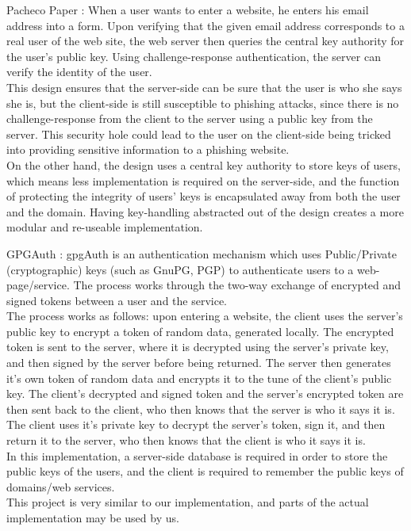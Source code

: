 \documentclass[11pt]{article}
\begin{document}
Pacheco Paper \cite{pacheco}:
When a user wants to enter a website, he enters his email address into a form. Upon verifying that the given email address corresponds to a real user of the web site, the web server then queries the central key authority for the user's public key. Using challenge-response authentication, the server can verify the identity of the user.\\
	This design ensures that the server-side can be sure that the user is who she says she is, but the client-side is still susceptible to phishing attacks, since there is no challenge-response from the client to the server using a public key from the server.  This security hole could lead to the user on the client-side being tricked into providing sensitive information to a phishing website.\\
	On the other hand, the design uses a central key authority to store keys of users, which means less implementation is required on the server-side, and the function of protecting the integrity of users' keys is encapsulated away from both the user and the domain.  Having key-handling abstracted out of the design creates a more modular and re-useable implementation.

GPGAuth \cite{gpgauth}:
gpgAuth is an authentication mechanism which uses Public/Private (cryptographic) keys (such as GnuPG, PGP) to authenticate users to a web-page/service.  The process works through the two-way exchange of encrypted and signed tokens between a user and the service.\\
	The process works as follows: upon entering a website, the client uses the server's public key to encrypt a token of random data, generated locally.  The encrypted token is sent to the server, where it is decrypted using the server's private key, and then signed by the server before being returned.  The server then generates it's own token of random data and encrypts it to the tune of the client's public key.  The client's decrypted and signed token  and the server's encrypted token are then sent back to the client, who then knows that the server is who it says it is.  The client uses it's private key to decrypt the server's token, sign it, and then return it to the server, who then knows that the client is who it says it is.\\
	In this implementation, a server-side database is required in order to store the public keys of the users, and the client is required to remember the public keys of domains/web services.\\
	This project is very similar to our implementation, and parts of the actual implementation may be used by us.


{}
\end{document}
